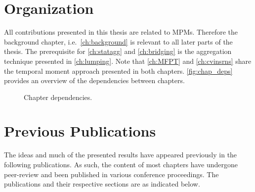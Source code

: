 \section{Organization}
All contributions presented in this thesis are related to \aclp{MPM}.
Therefore the background chapter, i.e.\ \autoref{ch:background} is relevant
to all later parts of the thesis.
The prerequisite for \autoref{ch:statagg} and \autoref{ch:bridging} is the aggregation
technique presented in \autoref{ch:lumping}.
Note that \autoref{ch:MFPT} and \autoref{ch:cvinsrns} share the temporal moment approach presented
in both chapters.
\autoref{fig:chap_deps} provides an overview of the dependencies between chapters.
\begin{figure}[htb]
	\centering
{}
	\caption{\label{fig:chap_deps}Chapter dependencies.}
\end{figure}


\section{Previous Publications}%
The ideas and much of the presented results have appeared previously in the following publications.
As such, the content of most chapters have undergone peer-review and been published in various conference proceedings.
The publications and their respective sections are as indicated below.

